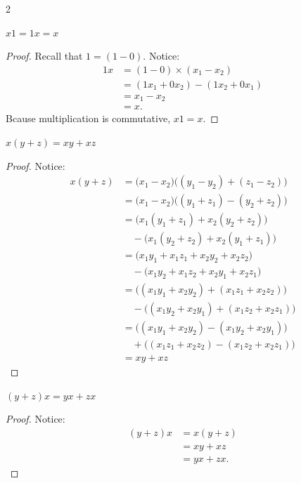 \begin{multicols}{2}
\begin{proposition}
	$x1 = 1x = x$
\end{proposition}
\begin{proof}
	Recall that $1 = (1 \minus 0).$ Notice:
	\begin{align*}
		1x &= (1 \minus 0) \times (x_1 \minus x_2) \\
		&= (1 x_1 + 0 x_2) \minus (1 x_2 + 0 x_1) \\
		&= x_1 \minus x_2 \\
		&= x.
	\end{align*}
Bcause multiplication is commutative, $x1 = x.$
\end{proof}
\begin{proposition}
	$x(y+z) = xy +xz$
\end{proposition}
\begin{proof}
	Notice:
	\begin{align*}
		x(y + z) &= \big(x_1 \minus x_2 \big) \big((y_1 \minus y_2) + (z_1 \minus z_2) \big) \\
		&= \big(x_1 \minus x_2 \big) \big((y_1 + z_1) \minus (y_2 + z_2) \big) \\
		&= \big(x_1(y_1 + z_1) + x_2(y_2 + z_2) \big) \\
		&\quad \minus \big(x_1(y_2 + z_2) + x_2(y_1 + z_1) \big) \\
		&= \big(x_1 y_1 + x_1 z_1 + x_2 y_2 + x_2 z_2 \big) \\
		&\quad \minus \big(x_1 y_2 + x_1 z_2 + x_2 y_1 + x_2 z_1 \big) \\
		&= \big( (x_1 y_1 + x_2 y_2) + (x_1 z_1 + x_2 z_2) \big) \\
		&\quad \minus \big((x_1 y_2 + x_2 y_1) + (x_1 z_2 + x_2 z_1) \big) \\
		&= \big((x_1 y_1 + x_2 y_2) \minus (x_1 y_2 + x_2 y_1) \big) \\
		&\quad + \big((x_1 z_1 + x_2 z_2) \minus (x_1 z_2 + x_2 z_1) \big) \\
		&= xy + xz
	\end{align*}
\end{proof}

\begin{proposition}
	$(y + z) x = yx + zx$
\end{proposition}
\begin{proof}
	Notice:
	\begin{align*}
		(y + z) x &= x (y + z) \\
		&= xy + xz \\
		&= yx + zx.
	\end{align*}
\end{proof}
\end{multicols}

